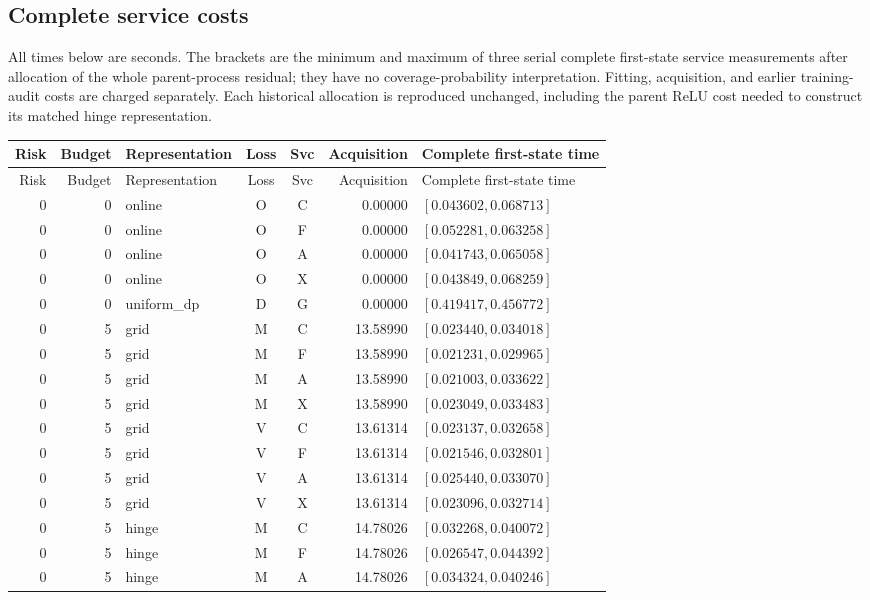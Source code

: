 \subsection{Complete service costs}
All times below are seconds. The brackets are the minimum and maximum of three serial complete first-state service measurements after allocation of the whole parent-process residual; they have no coverage-probability interpretation. Fitting, acquisition, and earlier training-audit costs are charged separately. Each historical allocation is reproduced unchanged, including the parent ReLU cost needed to construct its matched hinge representation.
\begingroup\scriptsize\setlength{\tabcolsep}{4pt}
\begin{longtable}{r r l c c r l}
\hline
Risk & Budget & Representation & Loss & Svc & Acquisition & Complete first-state time \\
\hline\endfirsthead
\hline Risk & Budget & Representation & Loss & Svc & Acquisition & Complete first-state time \\ \hline\endhead
0 & 0 & online & O & C & 0.00000 & $[0.043602,0.068713]$ \\
0 & 0 & online & O & F & 0.00000 & $[0.052281,0.063258]$ \\
0 & 0 & online & O & A & 0.00000 & $[0.041743,0.065058]$ \\
0 & 0 & online & O & X & 0.00000 & $[0.043849,0.068259]$ \\
0 & 0 & uniform\_dp & D & G & 0.00000 & $[0.419417,0.456772]$ \\
0 & 5 & grid & M & C & 13.58990 & $[0.023440,0.034018]$ \\
0 & 5 & grid & M & F & 13.58990 & $[0.021231,0.029965]$ \\
0 & 5 & grid & M & A & 13.58990 & $[0.021003,0.033622]$ \\
0 & 5 & grid & M & X & 13.58990 & $[0.023049,0.033483]$ \\
0 & 5 & grid & V & C & 13.61314 & $[0.023137,0.032658]$ \\
0 & 5 & grid & V & F & 13.61314 & $[0.021546,0.032801]$ \\
0 & 5 & grid & V & A & 13.61314 & $[0.025440,0.033070]$ \\
0 & 5 & grid & V & X & 13.61314 & $[0.023096,0.032714]$ \\
0 & 5 & hinge & M & C & 14.78026 & $[0.032268,0.040072]$ \\
0 & 5 & hinge & M & F & 14.78026 & $[0.026547,0.044392]$ \\
0 & 5 & hinge & M & A & 14.78026 & $[0.034324,0.040246]$ \\

\end{longtable}
